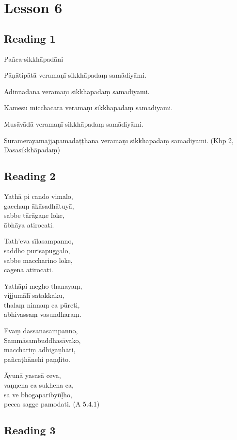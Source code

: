 \chapter{Lesson 6}

\section*{Reading 1}

Pañca-sikkhāpadāni

Pāṇātipātā veramaṇī sikkhāpadaṃ samādiyāmi.

Adinnādānā veramaṇī sikkhāpadaṃ samādiyāmi.

Kāmesu micchācārā veramaṇī sikkhāpadaṃ samādiyāmi.

Musāvādā veramaṇī sikkhāpadaṃ samādiyāmi.

Surāmerayamajjapamādaṭṭhānā veramaṇī sikkhāpadaṃ samādiyāmi. (Khp 2, Dasasikkhāpadaṃ)

\section*{Reading 2}

Yathā pi cando vimalo,\\
gacchaṃ ākāsadhātuyā,\\
sabbe tārāgaṇe loke,\\
ābhāya atirocati.

Tath’eva sīlasampanno,\\
saddho purisapuggalo,\\
sabbe maccharino loke,\\
cāgena atirocati.

Yathāpi megho thanayaṃ,\\
vijjumālī satakkaku,\\
thalaṃ ninnaṃ ca pūreti,\\
abhivassaṃ vasundharaṃ.

Evaṃ dassanasampanno,\\
Sammāsambuddhasāvako,\\
macchariṃ adhigaṇhāti,\\
pañcaṭhānehi paṇḍito.

Āyunā yasasā ceva,\\
vaṇṇena ca sukhena ca,\\
sa ve bhogaparibyūḷho,\\
pecca sagge pamodati. (A 5.4.1)

\section*{Reading 3}

